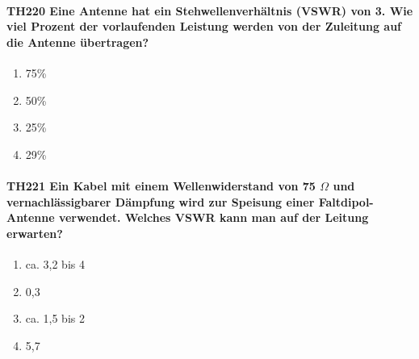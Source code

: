 \documentclass[8pt]{article}
\begin{document}
\paragraph*{TH220 Eine Antenne hat ein Stehwellenverhältnis (VSWR) von 3. Wie viel Prozent der vorlaufenden Leistung werden von der Zuleitung auf die Antenne übertragen?} 
\begin{enumerate}[nolistsep,label=\Alph*]
\item 75\%
\item 50\%
\item 25\%
\item 29\%
\end{enumerate}

\paragraph*{TH221 Ein Kabel mit einem Wellenwiderstand von 75 $\Omega$ und vernachlässigbarer Dämpfung wird zur Speisung einer Faltdipol-Antenne verwendet. Welches VSWR kann man auf der Leitung erwarten?}
\begin{enumerate}[nolistsep,label=\Alph*]
\item ca. 3,2 bis 4
\item 0,3
\item ca. 1,5 bis 2
\item 5,7
\end{enumerate}
\end{document}
